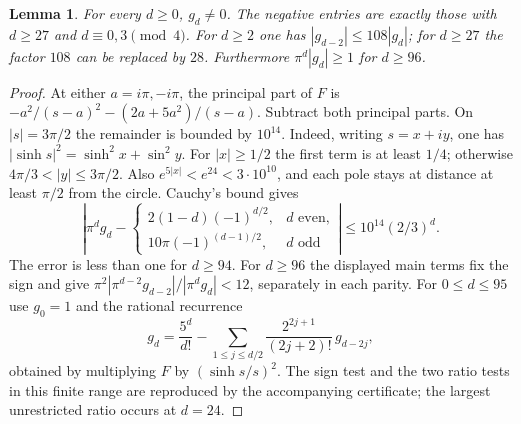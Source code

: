 \documentclass[11pt]{article}
\newtheorem{lemma}[theorem]{Lemma}
\begin{document}
\begin{lemma}\label{kernel}
For every \(d\ge0\), \(g_d\ne0\). The negative entries are exactly those with
\(d\ge27\) and \(d\equiv0,3\pmod4\).
For \(d\ge2\) one has \(|g_{d-2}|\le108|g_d|\); for \(d\ge27\)
the factor \(108\) can be replaced by \(28\). Furthermore
\(\pi^d|g_d|\ge1\) for \(d\ge96\).
\end{lemma}
\begin{proof}
At either \(a=i\pi,-i\pi\), the principal part of \(F\) is
\(-a^2/(s-a)^2-(2a+5a^2)/(s-a)\).
Subtract both principal parts. On \(|s|=3\pi/2\) the remainder is bounded
by \(10^{14}\). Indeed, writing \(s=x+iy\), one has
\(|\sinh s|^2=\sinh^2x+\sin^2y\). For \(|x|\ge1/2\) the first term
is at least \(1/4\); otherwise \(4\pi/3<|y|\le3\pi/2\).
Also \(e^{5|x|}<e^{24}<3\cdot10^{10}\), and each pole stays
at distance at least \(\pi/2\) from the circle. Cauchy's bound gives
\[
 \left|\pi^d g_d-
 \begin{cases}
 2(1-d)(-1)^{d/2},&d\text{ even},\\
 10\pi(-1)^{(d-1)/2},&d\text{ odd}
 \end{cases}\right|\le10^{14}(2/3)^d.
\]
The error is less than one for \(d\ge94\). For \(d\ge96\) the displayed
main terms fix the sign and give
\(\pi^2|\pi^{d-2}g_{d-2}|/|\pi^dg_d|<12\), separately in each parity.
For \(0\le d\le95\) use \(g_0=1\) and the rational recurrence
\[
 g_d=\frac{5^d}{d!}-
 \sum_{1\le j\le d/2}\frac{2^{2j+1}}{(2j+2)!}\,g_{d-2j},
\]
obtained by multiplying \(F\) by \((\sinh s/s)^2\).
The sign test and the two ratio tests in this finite range are reproduced
by the accompanying certificate; the largest unrestricted ratio occurs at \(d=24\).
\end{proof}
\end{document}
